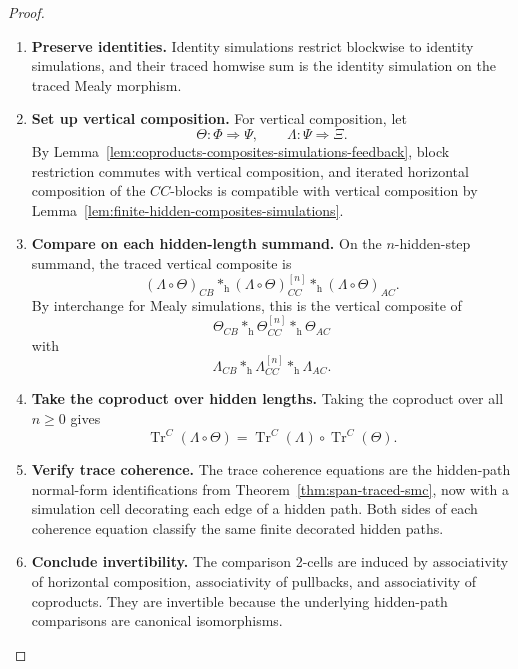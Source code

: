 \begin{proof}
\begin{enumerate}
  \item \textbf{Preserve identities.}
  Identity simulations restrict blockwise to identity simulations, and their
  traced homwise sum is the identity simulation on the traced Mealy morphism.

  \item \textbf{Set up vertical composition.}
  For vertical composition, let
  \[
    \Theta:\Phi\Rightarrow\Psi,
    \qquad
    \Lambda:\Psi\Rightarrow\Xi.
  \]
  By Lemma~\ref{lem:coproducts-composites-simulations-feedback}, block
  restriction commutes with vertical composition, and iterated horizontal
  composition of the \(CC\)-blocks is compatible with vertical composition by
  Lemma~\ref{lem:finite-hidden-composites-simulations}.

  \item \textbf{Compare on each hidden-length summand.}
  On the \(n\)-hidden-step summand, the traced vertical composite is
  \[
    (\Lambda\circ\Theta)_{CB}
    \ast_{\mathrm h}
    (\Lambda\circ\Theta)_{CC}^{[n]}
    \ast_{\mathrm h}
    (\Lambda\circ\Theta)_{AC}.
  \]
  By interchange for Mealy simulations, this is the vertical composite of
  \[
    \Theta_{CB}
    \ast_{\mathrm h}
    \Theta_{CC}^{[n]}
    \ast_{\mathrm h}
    \Theta_{AC}
  \]
  with
  \[
    \Lambda_{CB}
    \ast_{\mathrm h}
    \Lambda_{CC}^{[n]}
    \ast_{\mathrm h}
    \Lambda_{AC}.
  \]

  \item \textbf{Take the coproduct over hidden lengths.}
  Taking the coproduct over all \(n\geq 0\) gives
  \[
    \operatorname{Tr}^{C}(\Lambda\circ\Theta)
    =
    \operatorname{Tr}^{C}(\Lambda)\circ\operatorname{Tr}^{C}(\Theta).
  \]

  \item \textbf{Verify trace coherence.}
  The trace coherence equations are the hidden-path normal-form
  identifications from Theorem~\ref{thm:span-traced-smc}, now with a
  simulation cell decorating each edge of a hidden path. Both sides of each
  coherence equation classify the same finite decorated hidden paths.

  \item \textbf{Conclude invertibility.}
  The comparison 2-cells are induced by associativity of horizontal
  composition, associativity of pullbacks, and associativity of coproducts.
  They are invertible because the underlying hidden-path comparisons are
  canonical isomorphisms.
\end{enumerate}
\end{proof}

